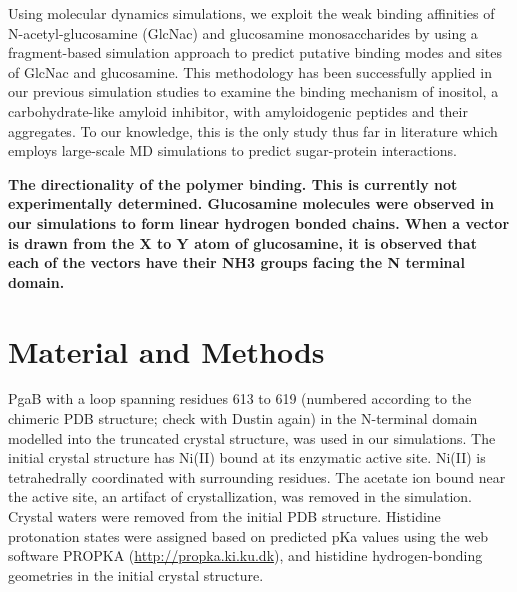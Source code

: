 Using molecular dynamics simulations, we exploit the weak binding affinities of N-acetyl-glucosamine (GlcNac) and glucosamine monosaccharides by using a fragment-based simulation approach to predict putative binding modes and sites of GlcNac and glucosamine. This methodology has been successfully applied in our previous simulation studies to examine the binding mechanism of inositol, a carbohydrate-like amyloid inhibitor, with amyloidogenic peptides and their aggregates. To our knowledge, this is the only study thus far in literature which employs large-scale MD simulations to predict sugar-protein interactions.

\textbf{The directionality of the polymer binding.  This is currently not experimentally determined. Glucosamine molecules were observed in our simulations to form linear hydrogen bonded chains. When a vector is drawn from the X to Y atom of glucosamine, it is observed that each of the vectors have their NH3 groups facing the N terminal domain.}


\section{Material and Methods}
PgaB with a loop spanning residues 613 to 619 (numbered according to the chimeric PDB structure; check with Dustin again) in the N-terminal domain modelled into the truncated crystal structure, was used in our simulations. The initial crystal structure has Ni(II) bound at its enzymatic active site. Ni(II) is tetrahedrally coordinated with surrounding residues.  The acetate ion bound near the active site, an artifact of crystallization, was removed in the simulation. Crystal waters were removed from the initial PDB structure. Histidine protonation states were assigned based on predicted pKa values using the web software PROPKA (\url{http://propka.ki.ku.dk}), and histidine hydrogen-bonding geometries in the initial crystal structure.


